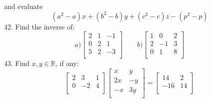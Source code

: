 \documentclass[11pt]{amsbook}
\begin{document}
and evaluate
\[
(a^2-a)x+(b^2-b)y+(c^2-c)z-(p^2-p)
\]
42. Find the inverse of:
\[
a) 
 \begin{bmatrix}
    2  & 1 &  -1 \\
    0  & 2 &  1  \\
    5  & 2 &  -3 \\
\end{bmatrix}
\qquad b) 
 \begin{bmatrix}
   1  & 0 &  2 \\
    2  & -1 &  3 \\
    0  & 1 &  8 \\
\end{bmatrix}
\]
43. Find $x, y\in \mathbb{R}$, if any:
\[
 \begin{bmatrix}
    2  & 3 &  1 \\
    0  & -2 &  4 \\
\end{bmatrix} 
 \begin{bmatrix}
    x  & y \\
    2x & -y  \\
    -x & 3y  \\
\end{bmatrix}
=
\begin{bmatrix}
    14 & 2  \\
    -16 & 14  \\
\end{bmatrix}
\]
\end{document}
